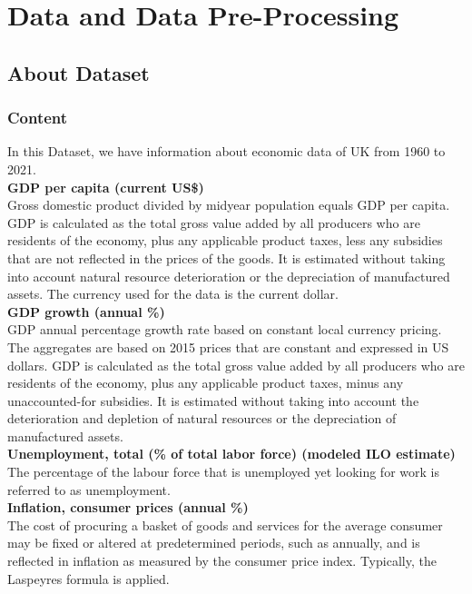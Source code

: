 
\chapter{Data and Data Pre-Processing}
\section{About Dataset}
\subsection{Content}
In this Dataset, we have information about economic data of UK from 1960 to 2021. \\

\textbf{GDP per capita (current US\$)} \\
Gross domestic product divided by midyear population equals GDP per capita. GDP is calculated as the total gross value added by all producers who are residents of the economy, plus any applicable product taxes, less any subsidies that are not reflected in the prices of the goods. It is estimated without taking into account natural resource deterioration or the depreciation of manufactured assets. The currency used for the data is the current dollar. \\


\textbf{GDP growth (annual \%)}\\
GDP annual percentage growth rate based on constant local currency pricing. The aggregates are based on 2015 prices that are constant and expressed in US dollars. GDP is calculated as the total gross value added by all producers who are residents of the economy, plus any applicable product taxes, minus any unaccounted-for subsidies. It is estimated without taking into account the deterioration and depletion of natural resources or the depreciation of manufactured assets.\\

\textbf{Unemployment, total (\% of total labor force) (modeled ILO estimate)}\\
The percentage of the labour force that is unemployed yet looking for work is referred to as unemployment.\\

\textbf{Inflation, consumer prices (annual \%)}\\
The cost of procuring a basket of goods and services for the average consumer may be fixed or altered at predetermined periods, such as annually, and is reflected in inflation as measured by the consumer price index. Typically, the Laspeyres formula is applied.\\


